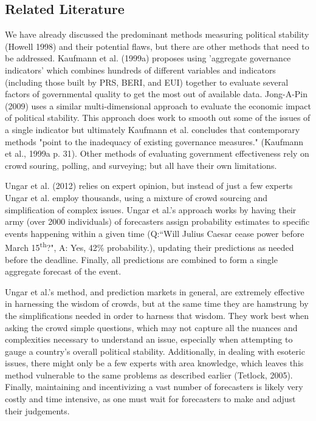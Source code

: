 \documentclass[12pt]{article}
\begin{document}
\begin{spacing}{1.5}
\section*{Related Literature}   

We have already discussed the predominant methods measuring political stability (Howell 1998) and their potential flaws, but there are other methods that need to be addressed. Kaufmann et al. (1999a) proposes using 'aggregate governance indicators' which combines hundreds of different variables and indicators (including those built by PRS, BERI, and EUI) together to evaluate several factors of governmental quality to get the most out of available data. Jong-A-Pin (2009) uses a similar multi-dimensional approach to evaluate the economic impact of political stability. This approach does work to smooth out some of the issues of a single indicator but ultimately Kaufmann et al. concludes that contemporary methods "point to the inadequacy of existing governance measures." (Kaufmann et al., 1999a p. 31). Other methods of evaluating government effectiveness rely on crowd souring, polling, and surveying; but all have their own limitations. 

Ungar et al. (2012) relies on expert opinion, but instead of just a few experts Ungar et al. employ thousands, using a mixture of crowd sourcing and simplification of complex issues. Ungar et al.'s approach works by having their army (over 2000 individuals) of forecasters assign probability estimates to specific events happening within a given time (Q:``Will Julius Caesar cease power before March 15\textsuperscript{th}?", A: Yes, 42\% probability.), updating their predictions as needed before the deadline. Finally, all predictions are combined to form a single aggregate forecast of the event. 

Ungar et al.'s method, and prediction markets in general, are extremely effective in harnessing the wisdom of crowds, but at the same time they are hamstrung by the simplifications needed in order to harness that wisdom. They work best when asking the crowd simple questions, which may not capture all the nuances and complexities necessary to understand an issue, especially when attempting to gauge a country's overall political stability. Additionally, in dealing with esoteric issues, there might only be a few experts with area knowledge, which leaves this method vulnerable to the same problems as described earlier (Tetlock, 2005). Finally, maintaining and incentivizing a vast number of forecasters is likely very costly and time intensive, as one must wait for forecasters to make and adjust their judgements. 


\end{spacing}
\end{document}
